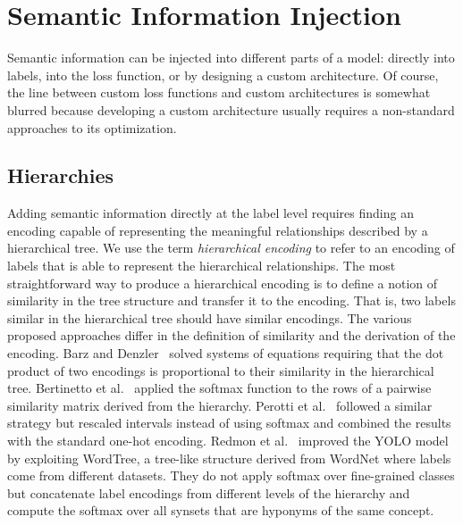 \section{Semantic Information Injection}
\label{sec:semantic-information-injection}

Semantic information can be injected into different parts of a model: directly
into labels, into the loss function, or by designing a custom architecture. Of %
course, the line between custom loss functions and custom architectures is %
somewhat blurred because developing a custom architecture usually requires a
non-standard approaches to its optimization.

\subsection{Hierarchies}
\label{subsec:hierarchies}

Adding semantic information directly at the label level requires finding an
encoding capable of representing the meaningful relationships described by a
hierarchical tree. We use the term \emph{hierarchical encoding} to refer to an
encoding of labels that is able to represent the hierarchical relationships.
The most straightforward way to produce a hierarchical encoding is to define a
notion of similarity in the tree structure and transfer it to the encoding.
That is, two labels similar in the hierarchical tree should have similar
encodings. The various proposed approaches differ in the definition of
similarity and the derivation of the encoding. Barz and
Denzler~\cite{HierarchyBasedBarz2018} solved systems of equations requiring
that the dot product of two encodings is proportional to their similarity in
the hierarchical tree. Bertinetto et al.~\cite{MakingBetterMBertin2019} applied
the softmax function to the rows of a pairwise similarity matrix derived from
the hierarchy. Perotti et al.~\cite{BeyondOneHotPerott2023} followed a similar
strategy but rescaled intervals instead of using softmax and combined the
results with the standard one-hot encoding. Redmon et
al.~\cite{Yolo9000BetteRedmon2016} improved the YOLO
model~\cite{YouOnlyLookORedmon2015} by exploiting WordTree, a tree-like
structure derived from WordNet where labels come from different datasets. They
do not apply softmax over fine-grained classes but concatenate label encodings
from different levels of the hierarchy and compute the softmax over all synsets
that are hyponyms of the same concept.

